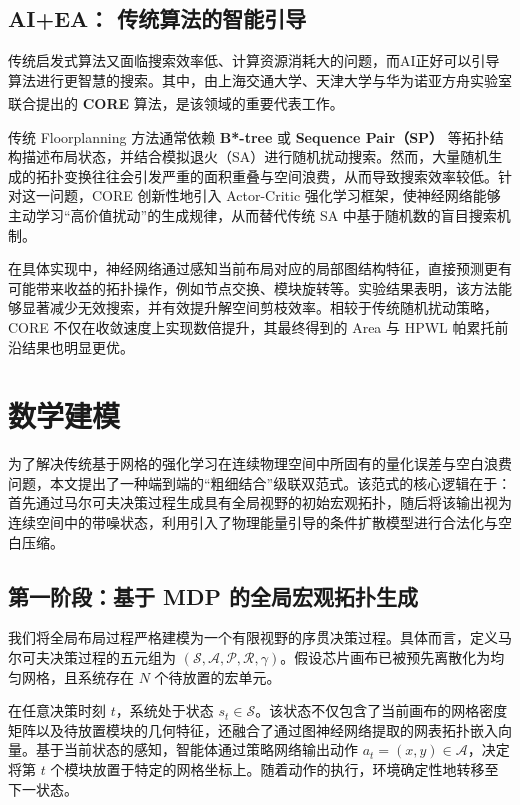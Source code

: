 \documentclass[12pt, a4paper]{article}
\begin{document}
\subsection{AI+EA： 传统算法的智能引导}

传统启发式算法又面临搜索效率低、计算资源消耗大的问题，而AI正好可以引导算法进行更智慧的搜索。其中，由上海交通大学、天津大学与华为诺亚方舟实验室联合提出的 \textbf{CORE} \textsuperscript{\cite{liCORECollaborativeOptimization}}算法，是该领域的重要代表工作。

传统 Floorplanning 方法通常依赖 \textbf{B*-tree} 或 \textbf{Sequence Pair（SP）} 等拓扑结构描述布局状态，并结合模拟退火（SA）进行随机扰动搜索。然而，大量随机生成的拓扑变换往往会引发严重的面积重叠与空间浪费，从而导致搜索效率较低。针对这一问题，CORE 创新性地引入 Actor-Critic 强化学习框架，使神经网络能够主动学习“高价值扰动”的生成规律，从而替代传统 SA 中基于随机数的盲目搜索机制。

在具体实现中，神经网络通过感知当前布局对应的局部图结构特征，直接预测更有可能带来收益的拓扑操作，例如节点交换、模块旋转等。实验结果表明，该方法能够显著减少无效搜索，并有效提升解空间剪枝效率。相较于传统随机扰动策略，CORE 不仅在收敛速度上实现数倍提升，其最终得到的 Area 与 HPWL 帕累托前沿结果也明显更优。

\section{数学建模} 
为了解决传统基于网格的强化学习在连续物理空间中所固有的量化误差与空白浪费问题，本文提出了一种端到端的“粗细结合”级联双范式。该范式的核心逻辑在于：首先通过马尔可夫决策过程生成具有全局视野的初始宏观拓扑，随后将该输出视为连续空间中的带噪状态，利用引入了物理能量引导的条件扩散模型进行合法化与空白压缩。

\subsection{第一阶段：基于 MDP 的全局宏观拓扑生成}

我们将全局布局过程严格建模为一个有限视野的序贯决策过程。具体而言，定义马尔可夫决策过程的五元组为 $(\mathcal{S}, \mathcal{A}, \mathcal{P}, \mathcal{R}, \gamma)$。假设芯片画布已被预先离散化为均匀网格，且系统存在 $N$ 个待放置的宏单元。

在任意决策时刻 $t$，系统处于状态 $s_t \in \mathcal{S}$。该状态不仅包含了当前画布的网格密度矩阵以及待放置模块的几何特征，还融合了通过图神经网络提取的网表拓扑嵌入向量。基于当前状态的感知，智能体通过策略网络输出动作 $a_t = (x, y) \in \mathcal{A}$，决定将第 $t$ 个模块放置于特定的网格坐标上。随着动作的执行，环境确定性地转移至下一状态。
\end{document}
